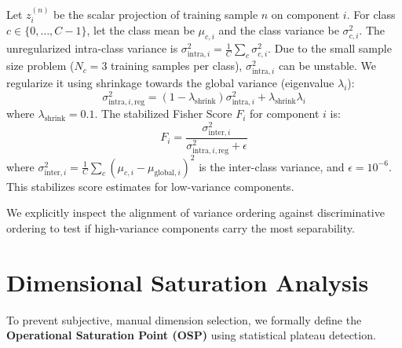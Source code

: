 \documentclass[conference]{IEEEtran}
\begin{document}
Let $z_i^{(n)}$ be the scalar projection of training sample $n$ on component $i$. For class $c \in \{0, \ldots, C-1\}$, let the class mean be $\mu_{c, i}$ and the class variance be $\sigma_{c, i}^2$. The unregularized intra-class variance is $\sigma_{\text{intra}, i}^2 = \frac{1}{C} \sum_c \sigma_{c, i}^2$. Due to the small sample size problem ($N_c = 3$ training samples per class), $\sigma_{\text{intra}, i}^2$ can be unstable. We regularize it using shrinkage towards the global variance (eigenvalue $\lambda_i$):
\begin{equation}
    \sigma_{\text{intra}, i, \text{reg}}^2 = (1 - \lambda_{\text{shrink}}) \sigma_{\text{intra}, i}^2 + \lambda_{\text{shrink}} \lambda_i
    \label{eq:shrinkage}
\end{equation}
where $\lambda_{\text{shrink}} = 0.1$. The stabilized Fisher Score $F_i$ for component $i$ is:
\begin{equation}
    F_i = \frac{\sigma_{\text{inter}, i}^2}{\sigma_{\text{intra}, i, \text{reg}}^2 + \epsilon}
    \label{eq:fisher}
\end{equation}
where $\sigma_{\text{inter}, i}^2 = \frac{1}{C} \sum_c (\mu_{c, i} - \mu_{\text{global}, i})^2$ is the inter-class variance, and $\epsilon = 10^{-6}$. This stabilizes score estimates for low-variance components.

We explicitly inspect the alignment of variance ordering against discriminative ordering to test if high-variance components carry the most separability.

\section{Dimensional Saturation Analysis}
\label{sec:saturation}

To prevent subjective, manual dimension selection, we formally define the \textbf{Operational Saturation Point (OSP)} using statistical plateau detection.
\end{document}
